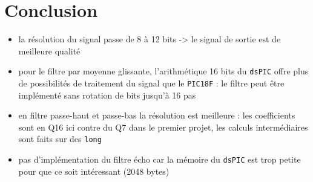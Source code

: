\documentclass{article}
\begin{document}
    \section{Conclusion}
    \begin{itemize}
        \item la résolution du signal passe de 8 à 12 bits -> le signal de sortie est de meilleure qualité
        \item pour le filtre par moyenne glissante, l'arithmétique 16 bits du \texttt{dsPIC} offre plus de possibilités de traitement du signal que le \texttt{PIC18F} : le filtre peut être implémenté sans rotation de bits jusqu'à 16 pas
        \item en filtre passe-haut et passe-bas la résolution est meilleure : les coefficients sont en Q16 ici contre du Q7 dans le premier projet, les calculs intermédiaires sont faits sur des \texttt{long}
        \item pas d'implémentation du filtre écho car la mémoire du \texttt{dsPIC} est trop petite pour que ce soit intéressant (2048 bytes)
    \end{itemize}
\end{document}
